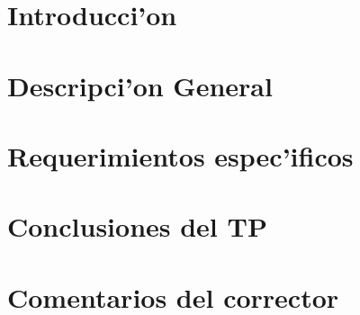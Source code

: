 \documentclass[spanish, a4paper, 10pt, titlepage]{article}
\author{Echevarr'ia - Farjat - Freijo - Giusto}
\begin{document}

\tableofcontents
\clearpage


\section{Introducci'on}

\clearpage

\section{Descripci'on General	}
 
\clearpage

\section{Requerimientos espec'ificos}
 
\clearpage


\appendix

\section{Conclusiones del TP}

\clearpage

\section{Comentarios del corrector}
\end{document}
